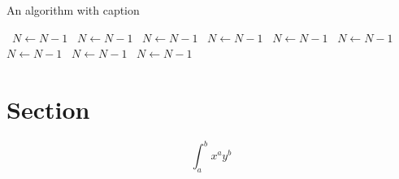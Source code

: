 \documentclass[a4paper]{article}
\begin{document}
\begin{algorithm}
\caption{An algorithm with caption}
\begin{algorithmic}
\    \State $N \gets N - 1$
\    \State $N \gets N - 1$
\    \State $N \gets N - 1$
\    \State $N \gets N - 1$
\    \State $N \gets N - 1$
\    \State $N \gets N - 1$
\    \State $N \gets N - 1$
\    \State $N \gets N - 1$
\    \State $N \gets N - 1$
\EndWhile
\end{algorithmic}
\end{algorithm}

\section{Section}

\[ \int_{a}^{b}{x^{a}y^{b}} \]
\end{document}
